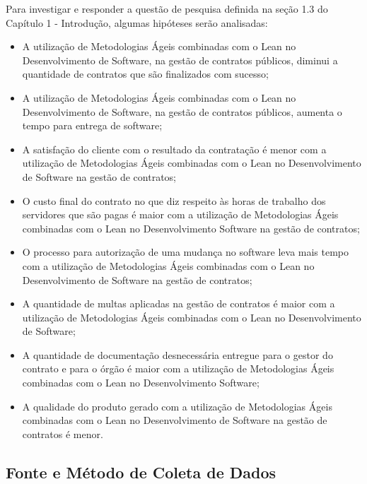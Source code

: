 Para investigar e responder a questão de pesquisa definida na seção 1.3 do Capítulo 1 - Introdução, algumas hipóteses serão analisadas:
\begin{itemize}
\item  A utilização de Metodologias Ágeis combinadas com o Lean no Desenvolvimento de Software, na gestão de contratos públicos, diminui a quantidade de contratos que são finalizados com sucesso;
\item  A utilização de Metodologias Ágeis combinadas com o Lean no Desenvolvimento de Software, na gestão de contratos públicos, aumenta o tempo para entrega de software;
\item	A satisfação do cliente com o resultado da contratação é menor com a utilização de Metodologias Ágeis combinadas com o Lean no Desenvolvimento de Software na gestão de contratos;
\item  O custo final do contrato no que diz respeito às horas de trabalho dos servidores que são pagas é maior com a utilização de Metodologias Ágeis combinadas com o Lean no Desenvolvimento Software na gestão de contratos;
\item  O processo para autorização de uma mudança no software leva mais tempo com a utilização de Metodologias Ágeis combinadas com o Lean no Desenvolvimento de Software na gestão de contratos;
\item	A quantidade de multas aplicadas na gestão de contratos é maior com a utilização de Metodologias Ágeis combinadas com o Lean no Desenvolvimento de Software;
\item	A quantidade de documentação desnecessária entregue para o gestor do contrato e para o órgão é maior com a utilização de Metodologias Ágeis combinadas com o Lean no Desenvolvimento Software;
\item  A qualidade do produto gerado com a utilização de Metodologias Ágeis combinadas com o Lean no Desenvolvimento de Software na gestão de contratos é menor.
\end{itemize}

\subsection[Fonte e Método Coleta de Dados]{Fonte e Método de Coleta de Dados}

